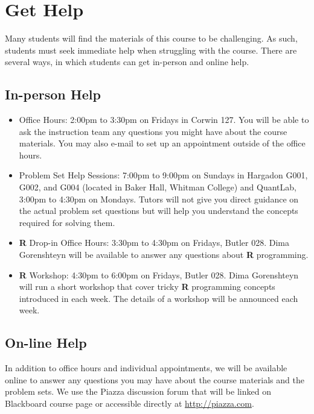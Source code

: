 \documentclass[11pt,letterpaper]{article}
\newcommand\R{\textsf{\textbf{R}}}
\begin{document}
\section*{Get Help} 

Many students will find the materials of this course to be
challenging.  As such, students must seek immediate help when
struggling with the course.  There are several ways, in which students
can get in-person and online help.

\subsection*{In-person Help}

\begin{itemize}
\item Office Hours: 2:00pm to 3:30pm on Fridays in Corwin 127. You
  will be able to ask the instruction team any questions you might
  have about the course materials.  You may also e-mail to set up an
  appointment outside of the office hours.

\item Problem Set Help Sessions: 7:00pm to 9:00pm on Sundays in
  Hargadon G001, G002, and G004 (located in Baker Hall, Whitman
  College) and QuantLab, 3:00pm to 4:30pm on Mondays.  Tutors will not
  give you direct guidance on the actual problem set questions but
  will help you understand the concepts required for solving them.

\item \R{} Drop-in Office Hours: 3:30pm to 4:30pm on Fridays, Butler 
  028.  Dima Gorenshteyn will be available to answer any questions
  about \R{} programming. 

\item \R{} Workshop: 4:30pm to 6:00pm on Fridays, Butler 
  028.  Dima Gorenshteyn will run a short workshop that cover tricky 
  \R{} programming concepts introduced in each week.  The details of a
  workshop will be announced each week. 

\end{itemize}

\subsection*{On-line Help}

In addition to office hours and individual appointments, we will be
available online to answer any questions you may have about the course
materials and the problem sets.  We use the Piazza discussion forum
that will be linked on Blackboard course page or accessible directly
at \url{http://piazza.com}.
\end{document}
